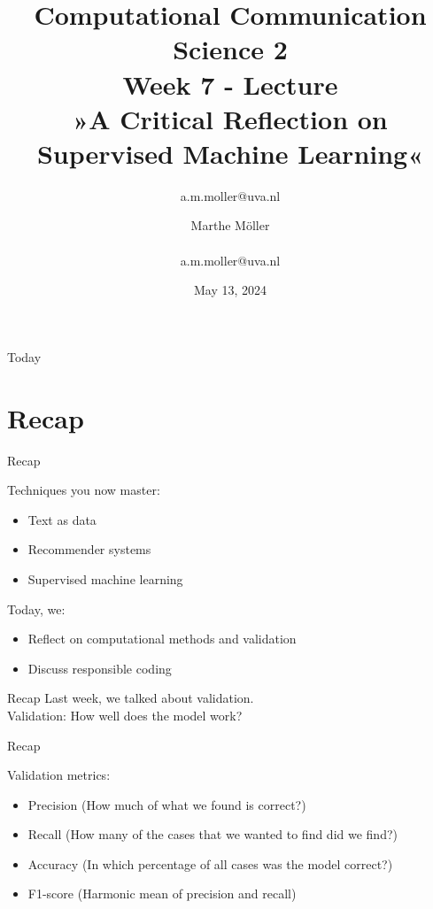 \documentclass[compress]{beamer}
\title[Computational Communication Science 2]{\textbf{Computational Communication Science 2} \\Week 7 - Lecture\\ »A Critical Reflection on Supervised Machine Learning«}
\author[Marthe Möller]{a.m.moller@uva.nl}\author[A. Marthe Möller]{Marthe Möller \\ ~ \\ \footnotesize{a.m.moller@uva.nl} \\}
\date{May 13, 2024}
\institute[Digital Society Minor, University of Amsterdam]{Digital Society Minor, University of Amsterdam}
\begin{document}
	
\begin{frame}{}
		\titlepage
\end{frame}
	
\begin{frame}{Today}
	\begin{tiny}
		\tableofcontents
	\end{tiny}
\end{frame}


\section{Recap}

\begin{frame}[fragile]{Recap} 
	
\begin{alertblock}{Techniques you now master:}
\begin{itemize}
	\item Text as data
	\item Recommender systems
	\item Supervised machine learning
\end{itemize}
\end{alertblock}

\begin{alertblock}{Today, we:}
\begin{itemize}
	\item Reflect on computational methods and validation
	\item Discuss responsible coding
\end{itemize}
\end{alertblock}
\end{frame}


\begin{frame}[fragile]{Recap} 	
Last week, we  talked about validation. \\
Validation: How well does the model work?
\end{frame}


\begin{frame}[fragile]{Recap} 	
\begin{alertblock}{Validation metrics:}
	\begin{itemize}
		\item Precision (How much of what we found is correct?)
		\item Recall (How many of the cases that we wanted to find did we find?)
		\item Accuracy (In which percentage of all cases was the model correct?)
		\item F1-score (Harmonic mean of precision and recall)
	\end{itemize}
\end{alertblock}
\end{frame}
\end{document}
